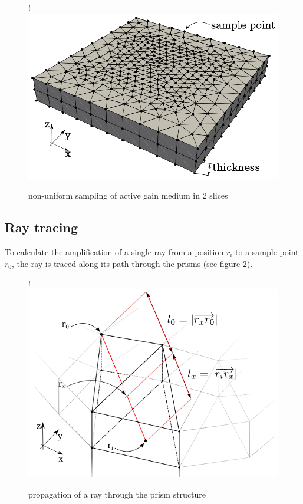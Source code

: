 \begin{figure}
  \centerline{
     {!} {\includegraphics{graphics/samples_reduced.png}}
  }
  \caption{non-uniform sampling of active gain medium in 2 slices}
  \label{graphic:samples_reduced}
\end{figure}




\subsection{Ray tracing}
\label{subsec:raytracing}

To calculate the amplification of a single ray from a position $r_i$ to a sample
point $r_0$, the ray is traced along its path through the prisms (see figure
\ref{graphic:prism_propagation}). 

\begin{figure}[H]
  \centerline{
     {!} {\includegraphics{./graphics/prism_propagation_2.png}}
  }
  \caption{propagation of a ray through the prism structure}
  \label{graphic:prism_propagation}
\end{figure}

